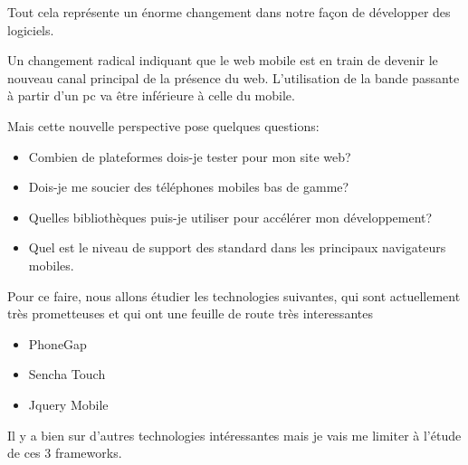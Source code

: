 Tout cela représente un énorme changement dans notre façon de développer des logiciels.

Un changement radical indiquant que le web mobile est en train de devenir le nouveau canal principal de la présence du web. L’utilisation de la bande passante à partir d’un pc va être inférieure à celle du mobile.

Mais cette nouvelle perspective pose quelques questions:

\begin{itemize}

  \item
  Combien de plateformes dois-je tester pour mon site web?

  \item
  Dois-je me soucier des téléphones mobiles bas de gamme?

  \item
  Quelles bibliothèques puis-je utiliser pour accélérer mon développement?

  \item
  Quel est le niveau de support des standard dans les principaux navigateurs mobiles.

\end{itemize}
Pour ce faire, nous allons étudier les technologies suivantes, qui sont actuellement très prometteuses et qui ont une feuille de route très interessantes


\begin{itemize}

  \item[\textbullet]
  PhoneGap

  \item[\textbullet]
  Sencha Touch

  \item[\textbullet]
  Jquery Mobile

\end{itemize}

Il y a bien sur d’autres technologies intéressantes mais je vais me limiter à l’étude de ces 3 frameworks.